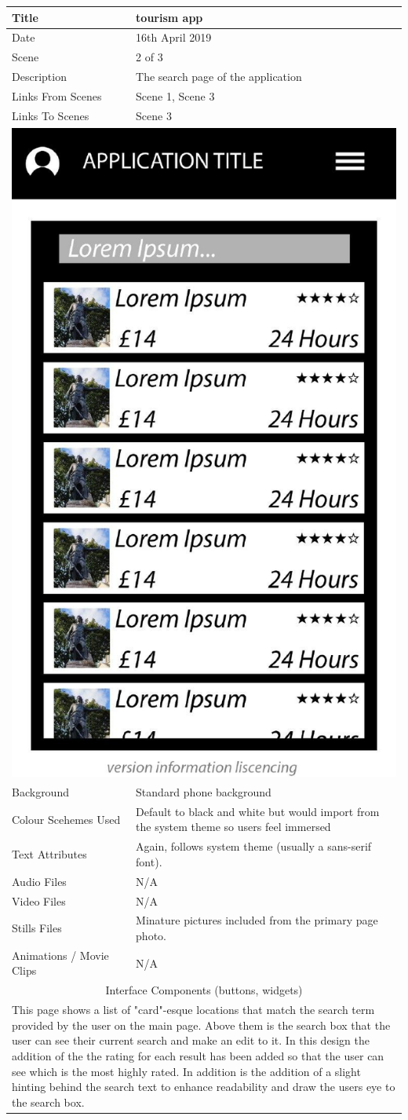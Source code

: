 \hspace{-1cm}
	\centering
	\begin{tabular}{p{4cm}p{10cm}}
		\hline
		Title & tourism app \\
		\hline
		Date & 16th April 2019 \\
		\hline
		Scene & 2 of 3 \\
		\hline
		Description & The search page of the application \\
		\hline
		Links From Scenes & Scene 1, Scene 3 \\
		\hline
		Links To Scenes & Scene 3 \\
		\hline
		\multicolumn{2}{c}{\includegraphics[width=0.5\linewidth]{images/screen1-1.jpg}} \\
		\hline
		Background & Standard phone background \\
		\hline
		Colour Scehemes Used & Default to black and white but would import from the system theme so users feel immersed \\
		\hline
		Text Attributes & Again, follows system theme (usually a sans-serif font). \\
		\hline
		Audio Files & N/A \\
		\hline
		Video Files & N/A \\
		\hline
		Stills Files & Minature pictures included from the primary page photo. \\
		\hline
		Animations / Movie Clips & N/A \\
		\hline
		\multicolumn{2}{c}{Interface Components (buttons, widgets)} \\
		\hline
		\multicolumn{2}{p{14cm}}{ This page shows a list of "card"-esque locations that match the search term provided by the user on the main page. Above them is the search box that the user can see their current search and make an edit to it. In this design the addition of the the rating for each result has been added so that the user can see which is the most highly rated. In addition is the addition of a slight hinting behind the search text to enhance readability and draw the users eye to the search box. } \\
		\hline
	\end{tabular}
